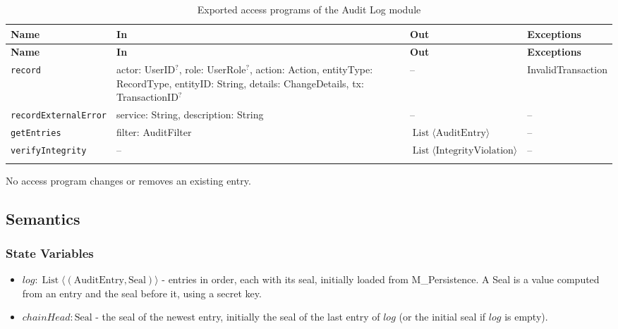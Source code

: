 \documentclass[12pt, titlepage]{article}
\begin{document}
\begingroup
\small
\setlength{\tabcolsep}{4pt}
\renewcommand{\arraystretch}{1.2}
\begin{longtable}{>{\raggedright\arraybackslash}p{}
        >{\raggedright\arraybackslash}p{}
        >{\raggedright\arraybackslash}p{}
        >{\raggedright\arraybackslash}p{}}
    \toprule
    \textbf{Name} & \textbf{In} & \textbf{Out} & \textbf{Exceptions} \\
    \midrule
    \endfirsthead
    \toprule
    \textbf{Name} & \textbf{In} & \textbf{Out} & \textbf{Exceptions} \\
    \midrule
    \endhead
    \endfoot
    \texttt{record} & actor: UserID$^{?}$, role: UserRole$^{?}$, action: Action, entityType: RecordType, entityID: String, details: ChangeDetails, tx: TransactionID$^{?}$ & -- & InvalidTransaction \\
    \texttt{recordExternalError} & service: String, description: String & -- & -- \\
    \texttt{getEntries} & filter: AuditFilter & $\operatorname{List}\langle\text{AuditEntry}\rangle$ & -- \\
    \texttt{verifyIntegrity} & -- & $\operatorname{List}\langle\text{IntegrityViolation}\rangle$ & -- \\
    \bottomrule
    \caption{Exported access programs of the Audit Log module}
    \label{TblAuditLogAccessPrograms}
\end{longtable}
\endgroup

No access program changes or removes an existing entry.

\subsection{Semantics}

\subsubsection{State Variables}

\begin{itemize}
    \item $\mathit{log}:\operatorname{List}\langle(\text{AuditEntry},\text{Seal})\rangle$
    - entries in order, each with its seal, initially loaded from M\_Persistence.
    A Seal is a value computed from an entry and the seal before it, using a secret key.
    \item $\mathit{chainHead}:\text{Seal}$ - the seal of the newest entry,
    initially the seal of the last entry of $\mathit{log}$ (or the initial seal if $\mathit{log}$ is empty).
\end{itemize}
\end{document}
